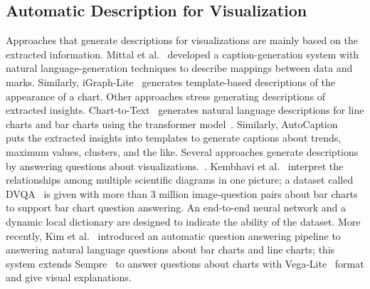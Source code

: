 \subsection{Automatic Description for Visualization}
Approaches that generate descriptions for visualizations are mainly based on the extracted information.
Mittal et al.~\cite{DBLP:journals/coling/MittalMCR98} developed a caption-generation system with natural language-generation techniques to describe mappings between data and marks.
Similarly, iGraph-Lite~\cite{DBLP:journals/tochi/FerresLST13} generates template-based descriptions of the appearance of a chart.
Other approaches stress generating descriptions of extracted insights.
Chart-to-Text~\cite{DBLP:conf/inlg/ObeidH20} generates natural language descriptions for line charts and bar charts using the transformer model~\cite{DBLP:conf/nips/VaswaniSPUJGKP17}. 
Similarly, AutoCaption~\cite{DBLP:conf/apvis/LiuXHWY20} puts the extracted insights into templates to generate captions about trends, maximum values, clusters, and the like.
Several approaches generate descriptions by answering questions about visualizations.~\cite{DBLP:conf/cvpr/KaflePCK18, DBLP:conf/chi/KimHA20, DBLP:conf/eccv/KembhaviSKSHF16}.
Kembhavi et al.~\cite{DBLP:conf/eccv/KembhaviSKSHF16} interpret the relationships among multiple scientific diagrams in one picture;
a dataset called DVQA~\cite{DBLP:conf/cvpr/KaflePCK18} is given with more than 3 million image-question pairs about bar charts to support bar chart question answering. 
An end-to-end neural network and a dynamic local dictionary are designed to indicate the ability of the dataset.
More recently, Kim et al.~\cite{DBLP:conf/chi/KimHA20} introduced an automatic question answering pipeline to answering natural language questions about bar charts and line charts; this system extends Sempre~\cite{DBLP:conf/acl/PasupatL15, DBLP:conf/emnlp/ZhangPL17} to answer questions about charts with Vega-Lite~\cite{DBLP:journals/tvcg/SatyanarayanMWH17} format and give visual explanations.

